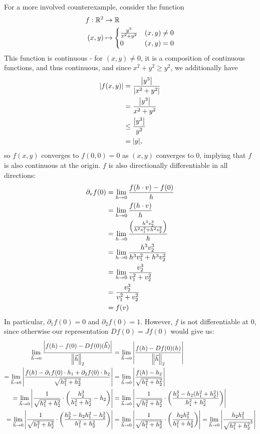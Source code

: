 \newpar
For a more involved counterexample, consider the function
\begin{align*}
	f : \mathbb{R}^2 &\to \mathbb{R}\\
	(x,y) &\mapsto 
	\begin{cases}
		\frac{y^3}{x^2 + y^2} & (x,y) \neq 0\\
		0 & (x,y) = 0
	\end{cases}
\end{align*}
This function is continuous - for $(x,y) \neq 0$, it is a composition of continuous functions, and thus continuous, and since $x^2 + y^2 \geq y^2$, we additionally have
\begin{align*}
	\abs{f(x,y)} 
	&= \frac{\abs{y^3}}{\abs{x^2 + y^2}}\\
	&= \frac{\abs{y^3}}{x^2 + y^2}\\
	&\leq \frac{\abs{y^3}}{y^2}\\
	&= \abs{y},
\end{align*}
so $f(x,y)$ converges to $f(0,0) = 0$ as $(x,y)$ converges to $0$, implying that $f$ is also continuous at the origin.
\newpar
$f$ is also directionally differentiable in all directions:
\begin{align*}
	\partial_v f(0)
	&= \lim_{h \to 0} \frac{f(h \cdot v) - f(0)}{h}\\
	&= \lim_{h \to 0} \frac{f(h \cdot v)}{h}\\
	&= \lim_{h \to 0} \frac{\qty(\frac{h^3v_2^3}{h^2 v_1^2 + h^2 v_2^2})}{h}\\
	&= \lim_{h \to 0} \frac{h^3v_2^3}{h^3 v_1^2 + h^3 v_2^2}\\
	&= \lim_{h \to 0} \frac{v_2^3}{v_1^2 + v_2^2}\\
	&= \frac{v_2^3}{v_1^2 + v_2^2}\\ 
	&= f(v)
\end{align*}
In particular, $\partial_1 f(0) = 0$ and $\partial_2 f(0) = 1$. However, $f$ is not differentiable at $0$, since otherwise our representation $Df(0) = Jf(0)$ would give us:
\begin{align*}
	\lim_{\vec{h} \to 0} \frac{\abs{f(h) - f(0) - Df(0)(\vec{h})}}{\norm{\vec{h}}_2}
	&=
	\lim_{\vec{h} \to 0} \abs{\frac{f(h) - Df(0)(h)}{\norm{\vec{h}}_2}}\\
	=
	\lim_{\vec{h} \to 0} \abs{\frac{f(h) - \partial_1 f(0) \cdot h_1 + \partial_2 f(0) \cdot h_2}{\sqrt{h_1^2 + h_2^2}}}
	&=
	\lim_{\vec{h} \to 0} \abs{\frac{f(h) - h_2}{\sqrt{h_1^2 + h_2^2}}}\\
	=
	\lim_{\vec{h} \to 0} \abs{\frac{1}{\sqrt{h_1^2 + h_2^2}} \cdot \qty(\frac{h_2^3}{h_1^2 + h_2^2} - h_2)}
	&=
	\lim_{\vec{h} \to 0} \abs{\frac{1}{\sqrt{h_1^2 + h_2^2}} \cdot \qty(\frac{h_2^3 - h_2(h_1^2 + h_2^2)}{h_1^2 + h_2^2})}\\
	=
	\lim_{\vec{h} \to 0} \abs{\frac{1}{\sqrt{h_1^2 + h_2^2}} \cdot \qty(\frac{h_2^3 - h_2h_1^2 - h_2^3}{h_1^2 + h_2^2})}
	&=
	\lim_{\vec{h} \to 0} \abs{\frac{1}{\sqrt{h_1^2 + h_2^2}} \cdot \qty(\frac{h_2h_1^2}{h_1^2 + h_2^2})}
	=
	\lim_{\vec{h} \to 0} \abs{\frac{h_2h_1^2}{\sqrt{h_1^2 + h_2^2}^3}}
\end{align*}
